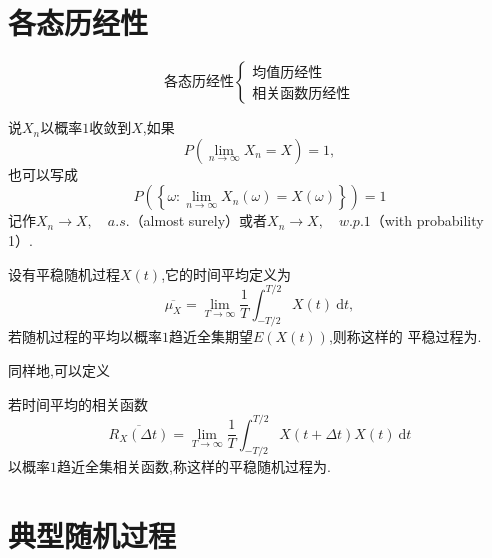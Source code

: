 \documentclass[cn,10pt,citestyle=gb7714-2015,bibstyle=gb7714-2015]{elegantbook}
\newcommand{\md}{\ \mathrm{d}}
\begin{document}
\section{各态历经性}
\[
    \text{各态历经性}\begin{cases}
      \text{均值历经性}\\
      \text{相关函数历经性}
    \end{cases}
\]
\begin{definition}[依概率$1$收敛]\label{def:convergence-in-P}
  说$X_n$以概率$1$收敛到$X$,如果
  \begin{equation}
    P\left(\lim_{n\to\infty}X_n=X\right)=1,
  \end{equation}
  也可以写成
  \begin{equation}
    P\left(\left\{\omega:\lim_{n\to\infty}X_n(\omega)=X(\omega)\right\}\right)=1
  \end{equation}
  记作$X_n\to X,\quad a.s.$（almost surely）或者$X_n\to X,\quad w.p.1$（with probability 1）.
\end{definition}
\begin{definition}\label{def:time-avg&exp-SP}
  设有平稳随机过程$X(t)$,它的时间平均定义为
  \begin{equation}
    \overline{\mu_X}=\lim_{T\to\infty}\frac{1}{T}\int_{-T/2}^{T/2}X(t)\md t,
  \end{equation}
  若随机过程的平均\colorbox{yellow!20}{以概率$1$趋近}全集期望$E(X(t))$,则称这样的
  平稳过程为.
\end{definition}
同样地,可以定义\begin{definition}[相关函数历经性]\label{raletive-SP}
  若时间平均的相关函数
  \begin{equation}
    \overline{R_X(\Delta t)}=\lim_{T\to\infty}\frac{1}{T}\int_{-T/2}^{T/2}X(t+\Delta t)X(t)\md t
  \end{equation}
  \colorbox{yellow!20}{以概率$1$趋近}全集相关函数,称这样的平稳随机过程为.
\end{definition}
\section{典型随机过程}
\end{document}
